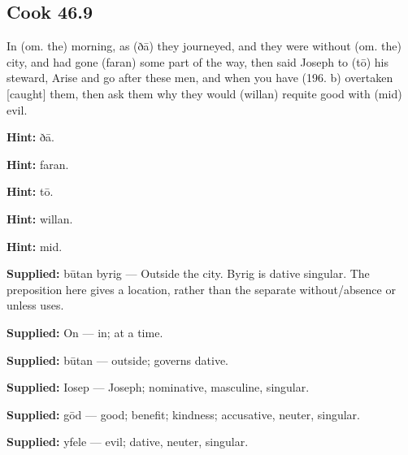 \par\begin{minipage}{\linewidth}\raggedright
\subsection*{Cook 46.9}

In (om. the) morning, as (ðā) they journeyed, and they were without (om. the) city, and had gone (faran) some part of the way, then said Joseph to (tō) his steward, Arise and go after these men, and when you have (196. b) overtaken [caught] them, then ask them why they would (willan) requite good with (mid) evil.

\textbf{Hint:} ðā.

\textbf{Hint:} faran.

\textbf{Hint:} tō.

\textbf{Hint:} willan.

\textbf{Hint:} mid.

\end{minipage}\par\addvspace{4pt}

\textbf{Supplied:} būtan byrig — Outside the city. Byrig is dative singular. The preposition here gives a location, rather than the separate without/\allowbreak{}absence or unless uses.

\textbf{Supplied:} On — in; at a time.

\textbf{Supplied:} būtan — outside; governs dative.

\textbf{Supplied:} Iosep — Joseph; nominative, masculine, singular.

\textbf{Supplied:} gōd — good; benefit; kindness; accusative, neuter, singular.

\textbf{Supplied:} yfele — evil; dative, neuter, singular.

